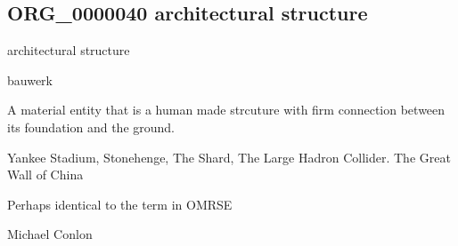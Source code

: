 \documentclass[letterpaper,10pt,english]{sphinxmanual}
\begin{document}
\subsection{ORG\_0000040 \sphinxhyphen{} architectural structure}
\label{\detokenize{doc-ORG_0000040:org-0000040-architectural-structure}}\label{\detokenize{doc-ORG_0000040:index-0}}\label{\detokenize{doc-ORG_0000040::doc}}
\begin{sphinxShadowBox}

\sphinxAtStartPar
architectural structure
\end{sphinxShadowBox}

\begin{sphinxShadowBox}

\sphinxAtStartPar
bauwerk
\end{sphinxShadowBox}

\begin{sphinxShadowBox}

\sphinxAtStartPar
A material entity that is a human made strcuture with firm connection between its foundation and the ground.
\end{sphinxShadowBox}

\begin{sphinxShadowBox}

\sphinxAtStartPar
{}
\end{sphinxShadowBox}

\begin{sphinxShadowBox}

\sphinxAtStartPar
Yankee Stadium, Stonehenge, The Shard, The Large Hadron Collider. The Great Wall of China
\end{sphinxShadowBox}

\begin{sphinxShadowBox}

\sphinxAtStartPar
Perhaps identical to the term in OMRSE
\end{sphinxShadowBox}

\begin{sphinxShadowBox}

\sphinxAtStartPar
Michael Conlon 
\end{sphinxShadowBox}
\end{document}
